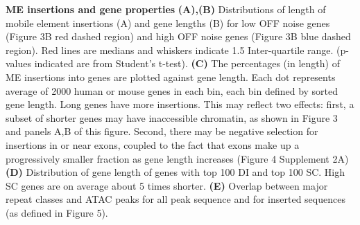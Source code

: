 \textbf{ME insertions and gene properties}\textbf{ (A),(B)} Distributions of length of mobile element insertions (A) and gene lengths (B) for low OFF noise genes (Figure 3B red dashed region) and high OFF noise genes (Figure 3B blue dashed region). Red lines are medians and whiskers indicate 1.5 Inter-quartile range. (p-values indicated are from Student’s t-test). \textbf{(C)} The percentages (in length) of ME insertions into genes are plotted against gene length. Each dot represents average of 2000 human or mouse genes in each bin, each bin defined by sorted gene length. Long genes have more insertions. This may reflect two effects: first, a subset of shorter genes may have inaccessible chromatin, as shown in Figure 3 and panels A,B of this figure. Second, there may be negative selection for insertions in or near exons, coupled to the fact that exons make up a progressively smaller fraction as gene length increases (Figure 4 Supplement 2A) \textbf{(D)} Distribution of gene length of genes with top 100 DI and top 100 SC. High SC genes are on average about 5 times shorter. \textbf{(E)} Overlap between major repeat classes and ATAC peaks for all peak sequence and for inserted sequences (as defined in Figure 5).